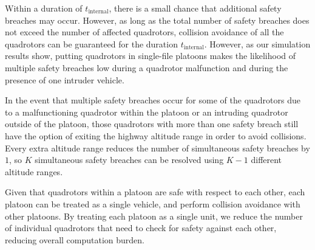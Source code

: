 Within a duration of $t_\text{internal}$, there is a small chance that additional safety breaches may occur. However, as long as the total number of safety breaches does not exceed the number of affected quadrotors, collision avoidance of all the quadrotors can be guaranteed for the duration $t_\text{internal}$. However, as our simulation results show, putting quadrotors in single-file platoons makes the likelihood of multiple safety breaches low during a quadrotor malfunction and during the presence of one intruder vehicle. 

In the event that multiple safety breaches occur for some of the quadrotors due to a malfunctioning quadrotor within the platoon or an intruding quadrotor outside of the platoon, those quadrotors with more than one safety breach still have the option of exiting the highway altitude range in order to avoid collisions. Every extra altitude range reduces the number of simultaneous safety breaches by $1$, so $K$ simultaneous safety breaches can be resolved using $K-1$ different altitude ranges. 

Given that quadrotors within a platoon are safe with respect to each other, each platoon can be treated as a single vehicle, and perform collision avoidance with other platoons. By treating each platoon as a single unit, we reduce the number of individual quadrotors that need to check for safety against each other, reducing overall computation burden.